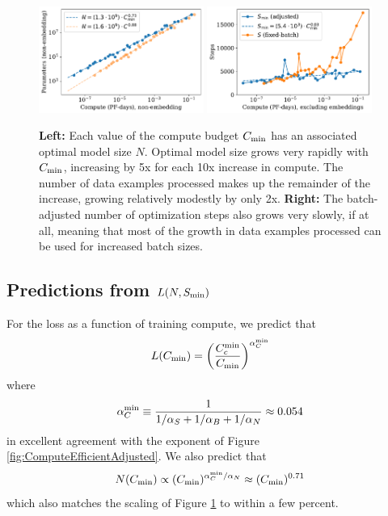 \documentclass[english]{article}
\newcommand{\be}{\begin{equation}}
\newcommand{\ee}{\end{equation}}
\begin{document}
\begin{figure}
\noindent \centering{}
\includegraphics[width=0.48\textwidth]{ComputevsOptimalModelSize}\hfill
\includegraphics[width=0.48\textwidth]{ComputeEfficientSteps}
\caption[Optimal model size and serial number of steps versus compute budget]{
\textbf{Left:} Each value of the compute budget $C_{\rm min}$ has an associated optimal model size $N$.  Optimal model size grows very rapidly with $C_{\rm min}$, increasing by 5x for each 10x increase in compute.  The number of data examples processed makes up the remainder of the increase, growing relatively modestly by only 2x.
\textbf{Right:} The batch-adjusted number of optimization steps also grows very slowly, if at all, meaning that most of the growth in data examples processed can be used for increased batch sizes.
\label{fig:ComputevsPerformance}}
\end{figure}

\subsection{Predictions from $L(N, S_{\rm min})$}

For the loss as a function of training compute, we predict that
\be
L(C_{\rm min}) = \left( \frac{C_c^{\rm min}}{C_{\rm min}} \right)^{\alpha_C^{\rm min}}
\ee
where
\be
\alpha_C^{\rm min} \equiv \frac{1}{1/\alpha_S + 1/\alpha_B + 1/\alpha_N} \approx 0.054
\ee
in excellent agreement with the exponent of Figure \ref{fig:ComputeEfficientAdjusted}.  We also predict that
\be
N(C_{\rm min}) \propto (C_{\rm min})^{\alpha_C^{\rm min} / \alpha_N} \approx  (C_{\rm min})^{0.71}
\ee
which also matches the scaling of Figure \ref{fig:ComputevsPerformance} to within a few percent.
\end{document}
